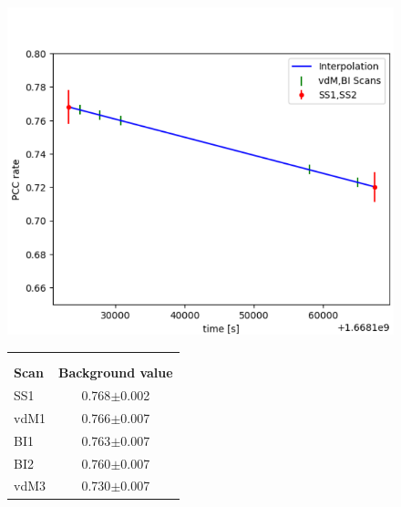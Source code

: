   \begin{figure}[!h]
  \label{interpolation}
  \begin{minipage}{1cm}
    \begin{center}
    \includegraphics[scale=.3]{Chapter4/interpolation2.png}
    \end{center}
  \end{minipage}
  \hfill
\begin{minipage}{6cm}
\centering
    \begin{center}
\begin{tabular}{lc}
                               & \multicolumn{1}{l}{}       \\
                               & \multicolumn{1}{l}{}       \\
\textbf{Scan}            & \textbf{Background value}  \\ 
\toprule
SS1           & 0.768$\pm$0.002               \\
vdM1          & 0.766$\pm$0.007              \\
BI1          & 0.763$\pm$0.007              \\
BI2          & 0.760$\pm$0.007              \\
vdM3          & 0.730$\pm$0.007              \\

\end{tabular}
\end{center}
\end{minipage}
\end{figure}
